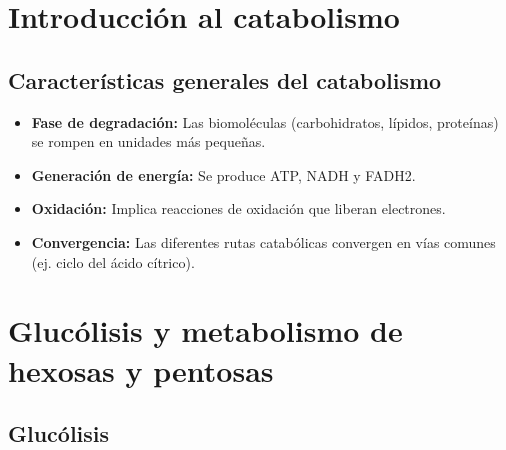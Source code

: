 
\section{Introducción al catabolismo}


\subsection{Características generales del catabolismo}
\begin{itemize}
    \item \textbf{Fase de degradación:} Las biomoléculas (carbohidratos, lípidos, proteínas) se rompen en unidades más pequeñas.
    \item \textbf{Generación de energía:} Se produce ATP, NADH y FADH2.
    \item \textbf{Oxidación:} Implica reacciones de oxidación que liberan electrones.
    \item \textbf{Convergencia:} Las diferentes rutas catabólicas convergen en vías comunes (ej. ciclo del ácido cítrico).
\end{itemize}

\section{Glucólisis y metabolismo de hexosas y pentosas}

\subsection{Glucólisis}


